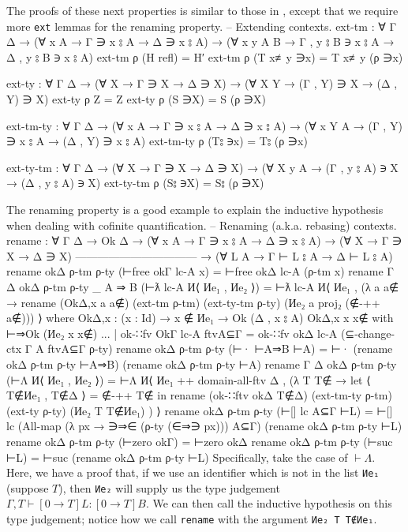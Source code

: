 \documentclass[logo,bsc,singlespacing,parskip,online]{infthesis}
\renewenvironment{code}{\mintedcopy[breaklines,breaksymbolleft=\;]{agda}}{\endmintedcopy}
\begin{document}
The proofs of these next properties is similar to those in \citet{wadler_programming_2022}, except
that we require more \texttt{ext} lemmas for the renaming property.
\begin{code}
  -- Extending contexts.
  ext-tm : ∀ {Γ Δ}
    → (∀ {x A}     →        Γ ∋ x ⦂ A →         Δ ∋ x ⦂ A)
    → (∀ {x y A B} → Γ , y ⦂ B ∋ x ⦂ A → Δ , y ⦂ B ∋ x ⦂ A)
  ext-tm ρ (H refl) = H′
  ext-tm ρ (T x≢y ∋x) = T x≢y (ρ ∋x)

  ext-ty : ∀ {Γ Δ}
    → (∀ {X}   →       Γ ∋ X →       Δ ∋ X)
    → (∀ {X Y} → (Γ , Y) ∋ X → (Δ , Y) ∋ X)
  ext-ty ρ Z = Z
  ext-ty ρ (S ∋X) = S (ρ ∋X)

  ext-tm-ty : ∀ {Γ Δ}
    → (∀ {x A}   →       Γ ∋ x ⦂ A →       Δ ∋ x ⦂ A)
    → (∀ {x Y A} → (Γ , Y) ∋ x ⦂ A → (Δ , Y) ∋ x ⦂ A)
  ext-tm-ty ρ (T⦂ ∋x) = T⦂ (ρ ∋x)

  ext-ty-tm : ∀ {Γ Δ}
    → (∀ {X}     →          Γ ∋ X →           Δ ∋ X)
    → (∀ {X y A} → (Γ , y ⦂ A) ∋ X → (Δ , y ⦂ A) ∋ X)
  ext-ty-tm ρ (S⦂ ∋X) = S⦂ (ρ ∋X)
\end{code}

The renaming property is a good example to explain the inductive hypothesis when dealing with
cofinite quantification.
\begin{code}
  -- Renaming (a.k.a. rebasing) contexts.
  rename : ∀ {Γ Δ}
    → Ok Δ
    → (∀ {x A} → Γ ∋ x ⦂ A → Δ ∋ x ⦂ A)
    → (∀ {X} → Γ ∋ X → Δ ∋ X)
      ---------------------------------
    → (∀ {L A} → Γ ⊢ L ⦂ A → Δ ⊢ L ⦂ A)
  rename okΔ ρ-tm ρ-ty (⊢free okΓ lc-A x) = ⊢free okΔ lc-A (ρ-tm x)
  rename {Γ} {Δ} okΔ ρ-tm ρ-ty {_} {A ⇒ B} (⊢ƛ lc-A И⟨ Иe₁ , Иe₂ ⟩) =
    ⊢ƛ lc-A И⟨ Иe₁ , (λ a {a∉} →
      rename (OkΔ,x a a∉) (ext-tm ρ-tm) (ext-ty-tm ρ-ty) (Иe₂ a {proj₂ (∉-++ a∉)})) ⟩
    where
      OkΔ,x : (x : Id) → x ∉ Иe₁ → Ok (Δ , x ⦂ A)
      OkΔ,x x x∉ with ⊢⇒Ok (Иe₂ x {x∉})
      ... | ok-∷fv OkΓ lc-A ftvA⊆Γ = ok-∷fv okΔ lc-A (⊆-change-ctx {Γ} {A} ftvA⊆Γ ρ-ty)
  rename okΔ ρ-tm ρ-ty (⊢· ⊢A⇒B ⊢A) = ⊢· (rename okΔ ρ-tm ρ-ty ⊢A⇒B) (rename okΔ ρ-tm ρ-ty ⊢A)
  rename {Γ} {Δ} okΔ ρ-tm ρ-ty (⊢Λ И⟨ Иe₁ , Иe₂ ⟩) =
    ⊢Λ И⟨ Иe₁ ++ domain-all-ftv Δ , (λ T {T∉} →
      let ⟨ T∉Иe₁ , T∉Δ ⟩ = ∉-++ T∉
      in rename (ok-∷ftv okΔ T∉Δ) (ext-tm-ty ρ-tm) (ext-ty ρ-ty) (Иe₂ T {T∉Иe₁}) ) ⟩
  rename okΔ ρ-tm ρ-ty (⊢[] lc A⊆Γ ⊢L) = ⊢[] lc (All-map (λ px → ∋⇒∈ (ρ-ty (∈⇒∋ px))) A⊆Γ) (rename okΔ ρ-tm ρ-ty ⊢L)
  rename okΔ ρ-tm ρ-ty (⊢zero okΓ) = ⊢zero okΔ
  rename okΔ ρ-tm ρ-ty (⊢suc ⊢L) = ⊢suc (rename okΔ ρ-tm ρ-ty ⊢L)
\end{code}
Specifically, take the case of $\vdash\Lambda$. Here, we have a proof that, if we use an identifier
which is not in the list \texttt{Иe₁} (suppose $T$), then \texttt{Иe₂} will supply us the type
judgement $\Gamma , T \vdash [0 \to T] L \colon [0 \to T] B$. We can then call the inductive
hypothesis on this type judgement; notice how we call \texttt{rename} with the argument \texttt{Иe₂
T {T∉Иe₁}}.
\end{document}
